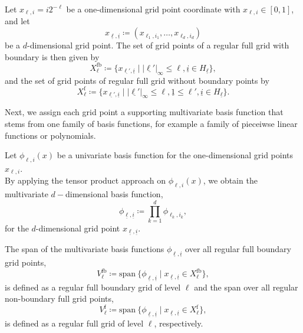 \documentclass[
  a4paper,  %
  twoside,  %
  bibliography=totoc,
  headsepline,
  cleardoublepage=empty,
  parskip=half,
  draft=false
]{scrbook}
\begin{document}
\begin{definition}
Let $x_{\ell,i}=i2^{-\ell}$ be a one-dimensional grid point coordinate with $x_{\ell,i} \in [0,1]$, and let
\begin{equation}
x_{\underline{\ell},\underline{i}} \coloneqq (x_{\ell_1,i_1}, \dots, x_{\ell_d,i_d})
\end{equation}
be a $d$-dimensional grid point. The set of grid points of a regular full grid with boundary is then given by
\begin{equation}
X^{\mathrm{fb}}_{\ell} \coloneqq \{x_{\underline{\ell'},\underline{i}} \mid |\underline{\ell'}|_{\infty} \leq \ell, \underline{i} \in H_{\underline{\ell}}\},
\end{equation}
and the set of grid points of regular full grid without boundary points by
\begin{equation}
X^{\mathrm{f}}_{\ell} \coloneqq \{x_{\underline{\ell'},\underline{i}} \mid |\underline{\ell'}|_{\infty} \leq \ell, \underline{1} \leq \ell',  \underline{i} \in H_{\underline{\ell}}\}.
\end{equation}
\end{definition}
%
Next, we assign each grid point a supporting multivariate basis function that stems from one family of basis functions, for example a family of pieceiwse linear functions or polynomials.

\begin{definition}
Let $\phi_{\ell,i}(x)$ be a univariate basis function for the one-dimensional grid points $x_{\ell,i}$.\\
By applying the tensor product approach on $\phi_{\ell,i}(x)$, we obtain the multivariate $d-$dimensional basis function,
\begin{equation}
\phi_{\underline{\ell},\underline{i}} \coloneqq \prod_{k=1}^{d} \phi_{\ell_k,i_k},
\end{equation}
for the $d$-dimensional grid point $x_{\underline{\ell},\underline{i}}$.
\label{def:basis_functions}
\end{definition}
%
\begin{definition}
The span of the multivariate basis functions $\phi_{\underline{\ell},\underline{i}}$ over all regular full boundary grid points,
\begin{equation}
V^{\mathrm{fb}}_{\ell} \coloneqq \mathrm{span}~ \{\phi_{\underline{\ell},\underline{i}} \mid x_{\underline{\ell},\underline{i}} \in X^{\mathrm{fb}}_{\ell}\},
\end{equation}
is defined as a regular full boundary grid of level $\ell$ and the span over all regular non-boundary full grid points,
\begin{equation}
V^{\mathrm{f}}_{\ell} \coloneqq \mathrm{span}~ \{\phi_{\underline{\ell},\underline{i}} \mid x_{\underline{\ell},\underline{i}} \in X^{\mathrm{f}}_{\ell}\},
\end{equation}
is defined as a regular full grid of level $\ell$, respectively.
\label{def:full_grid}
\end{definition}
\end{document}
